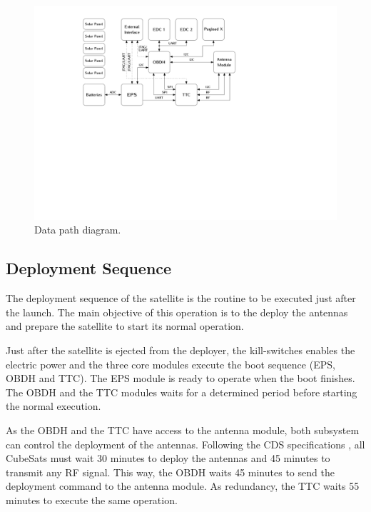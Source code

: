 \begin{figure}[!ht]
    \begin{center}
        \includegraphics[width=\textwidth]{figures/data_path_diagram.pdf}
        \caption{Data path diagram.}
        \label{fig:data-path}
    \end{center}
\end{figure}

\subsection{Deployment Sequence}

The deployment sequence of the satellite is the routine to be executed just after the launch. The main objective of this operation is to the deploy the antennas and prepare the satellite to start its normal operation.

Just after the satellite is ejected from the deployer, the kill-switches enables the electric power and the three core modules execute the boot sequence (EPS, OBDH and TTC). The EPS module is ready to operate when the boot finishes. The OBDH and the TTC modules waits for a determined period before starting the normal execution.

As the OBDH and the TTC have access to the antenna module, both subsystem can control the deployment of the antennas. Following the CDS specifications \cite{cds}, all CubeSats must wait 30 minutes to deploy the antennas and 45 minutes to transmit any RF signal. This way, the OBDH waits 45 minutes to send the deployment command to the antenna module. As redundancy, the TTC waits 55 minutes to execute the same operation.

